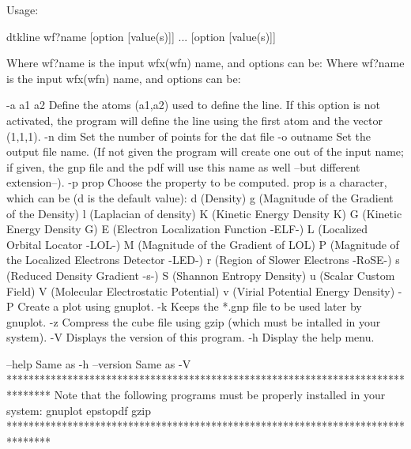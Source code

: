 Usage:

	dtkline wf?name [option [value(s)]] ... [option [value(s)]]

Where wf?name is the input wfx(wfn) name, and options can be:
Where wf?name is the input wfx(wfn) name, and options can be:

  -a a1 a2  	Define the atoms  (a1,a2) used to define the line.
            	  If this option is not activated, the program will 
            	  define the line using the first atom and the vector
            	  (1,1,1).
  -n  dim   	Set the number of points for the dat file
  -o outname	Set the output file name.
            	  (If not given the program will create one out of
            	  the input name; if given, the gnp file and the pdf will
            	  use this name as well --but different extension--).
  -p prop	Choose the property to be computed. prop is a character,
         	  which can be (d is the default value): 
         		d (Density)
         		g (Magnitude of the Gradient of the Density)
         		l (Laplacian of density)
         		K (Kinetic Energy Density K)
         		G (Kinetic Energy Density G)
         		E (Electron Localization Function -ELF-)
         		L (Localized Orbital Locator -LOL-)
         		M (Magnitude of the Gradient of LOL)
         		P (Magnitude of the Localized Electrons Detector -LED-)
         		r (Region of Slower Electrons -RoSE-)
         		s (Reduced Density Gradient -s-)
         		S (Shannon Entropy Density)
         		u (Scalar Custom Field)
         		V (Molecular Electrostatic Potential)
         		v (Virial Potential Energy Density)
  -P     	Create a plot using gnuplot.
  -k     	Keeps the *.gnp file to be used later by gnuplot.
  -z     	Compress the cube file using gzip (which must be intalled
         	   in your system).
  -V        	Displays the version of this program.
  -h     	Display the help menu.

  --help    		Same as -h
  --version 		Same as -V
********************************************************************************
  Note that the following programs must be properly installed in your system:
                                    gnuplot
                                    epstopdf
                                      gzip
********************************************************************************
